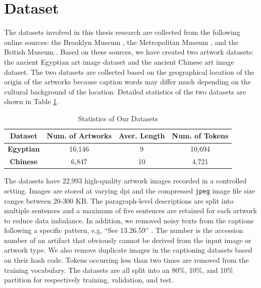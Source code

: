 \section{Dataset}

The datasets \cite{artworkcaption} involved in this thesis research are collected from the following online sources: the Brooklyn Museum \cite{brooklynmuseum}, the Metropolitan Museum \cite{themet}, and the British Museum \cite{thebritishmuseum}. Based on these sources, we have created two artwork datasets: the ancient Egyptian art image dataset and the ancient Chinese art image dataset. The two datasets are collected based on the geographical location of the origin of the artworks because caption words may differ much depending on the cultural background of the location. Detailed statistics of the two datasets are shown in Table \ref{fig:datasetstats}. 

\begin{table}[h!]
\centering
\begin{tabular}{|c|c|c|c|}
\hline
\textbf{Dataset}          & \textbf{Num. of Artworks} & \textbf{Aver. Length} & \textbf{Num. of Tokens} \\ \hline
\textbf{Egyptian} & 16,146                       & 9                       & 10,694                     \\ \hline
\textbf{Chinese}  & 6,847                        & 10                      & 4,721                      \\ \hline
\end{tabular}
\caption{Statistics of Our Datasets \cite{artworkcaption}}
\label{fig:datasetstats}
\end{table}

The datasets have 22,993 high-quality artwork images recorded
in a controlled setting. Images are stored at varying dpi and the
compressed \verb|jpeg| image file size ranges between 20-300 KB. The paragraph-level descriptions are split into multiple sentences and a maximum of five sentences are retained for each artwork to reduce data imbalance. In addition, we removed noisy texts from the captions following a specific pattern, e.g, ``See 13.26.59'' \cite{artworkcaption}. The number is the accession number of an artifact that obviously cannot be derived from the input image or artwork type. We also remove duplicate images in the captioning datasets based on their hash code. Tokens occurring less than two times are removed from the training vocabulary. The datasets are all split into an 80\%, 10\%, and 10\% partition for respectively training, validation, and test.

